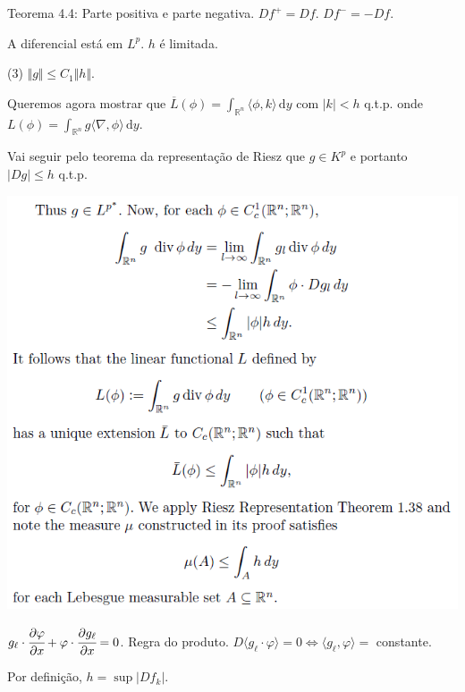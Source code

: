 \documentclass[12pt]{article}
\begin{document}
Teorema 4.4: Parte positiva e parte negativa. $Df^+ = Df.\,\,Df^- = - Df$.

A diferencial est\'a em $L^p$. $h$ \'e limitada.

\vspace{3mm}

(3) $\Vert g \Vert \le C_1 \Vert h \Vert$.

\vspace{3mm}

Queremos agora mostrar que $\overline{L}(\phi) = \int_{\mathbb{R}^n} \langle \phi, k\rangle \,\mathrm{d}y$ com $\vert k \vert < h$ q.t.p. onde $L(\phi) = \int_{\mathbb{R}^n} g \langle \nabla, \phi \rangle\,\mathrm{d}y$.

Vai seguir pelo teorema da representa\c{c}\~ao de Riesz que $g \in K^p$ e portanto $\vert Dg\vert \le h$ q.t.p.

\vspace{300mm}

		\begin{center}
		\includegraphics[scale=.9]{7}
		\end{center}

$g_\ell \cdot \cfrac{\partial \varphi}{\partial x} + \varphi \cdot \cfrac{\partial g_\ell}{\partial x} = 0$. Regra do produto. $D \langle g_\ell \cdot \varphi \rangle = 0 \Leftrightarrow \langle g_\ell, \varphi\rangle = $ constante.

Por defini\c{c}\~ao, $h = \sup \vert Df_k \vert$.
\end{document}
